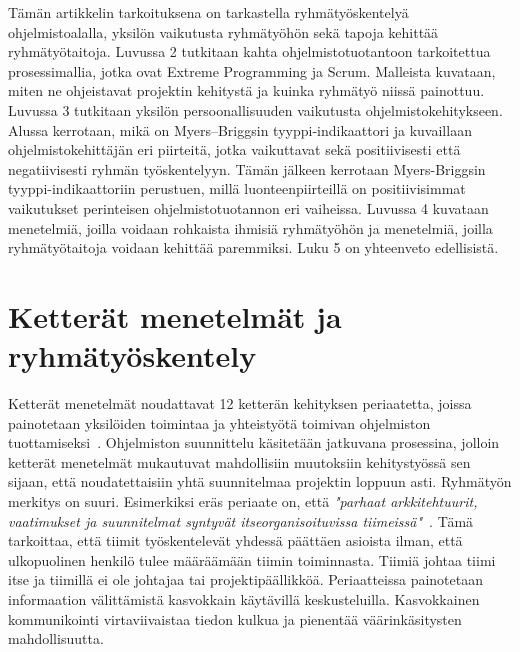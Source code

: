 \documentclass[finnish]{../tktltiki2}
\theoremstyle{definition}
\theoremstyle{remark}
\begin{document}
Tämän artikkelin tarkoituksena on tarkastella ryhmätyöskentelyä ohjelmistoalalla, yksilön vaikutusta ryhmätyöhön sekä tapoja kehittää ryhmätyö\-taitoja.
Luvussa 2 tutkitaan kahta ohjelmistotuotantoon tarkoitettua
prosessimallia, jotka ovat Extreme Programming ja Scrum. Malleista
kuvataan, miten ne ohjeistavat projektin kehitystä ja kuinka ryhmätyö niissä painottuu. Luvussa 3 tutkitaan yksilön persoonallisuuden vaikutusta ohjelmistokehitykseen. Alussa kerrotaan,
mikä on Myers--Briggsin tyyppi-indikaattori ja kuvaillaan ohjelmistokehittäjän eri piirteitä, jotka vaikuttavat sekä positiivisesti että negatiivisesti ryhmän työskentelyyn. Tämän jälkeen kerrotaan Myers-Briggsin tyyppi-indikaattoriin perustuen, millä luonteenpiirteillä on positiivisimmat vaikutukset perinteisen ohjelmistotuotannon eri vaiheissa. Luvussa 4 kuvataan
menetelmiä, joilla voidaan rohkaista ihmisiä ryhmätyöhön ja menetelmiä, joilla ryhmätyötaitoja voidaan kehittää paremmiksi. Luku 5 on yhteenveto
edellisistä.

\section{Ketterät menetelmät ja ryhmätyöskentely}


Ketterät menetelmät noudattavat 12 ketterän 
kehityksen periaatetta, joissa painotetaan yksilöiden toimintaa ja yhteistyötä toimivan ohjelmiston tuottamiseksi~\cite{AgileManifesto}. Ohjelmiston suunnittelu käsitetään jatkuvana prosessina, jolloin ketterät menetelmät mukautuvat mahdollisiin muutoksiin kehitystyössä sen sijaan, että noudatettaisiin yhtä suunnitelmaa projektin loppuun asti. Ryhmätyön merkitys on suuri. Esimerkiksi eräs periaate on, että 
\emph{"parhaat arkkitehtuurit, vaatimukset ja suunnitelmat syntyvät 
itseorganisoituvissa
tiimeissä"}~\cite{AgileManifesto}. Tämä tarkoittaa, että tiimit työskentelevät 
yhdessä päättäen asioista ilman, että ulkopuolinen henkilö tulee
määräämään tiimin toiminnasta. Tiimiä johtaa tiimi itse ja 
tiimillä ei ole johtajaa tai projektipäällikköä. Periaatteissa 
painotetaan informaation välittämistä kasvokkain käytävillä keskusteluilla.
Kasvokkainen kommunikointi virtaviivaistaa tiedon kulkua ja pienentää 
väärinkäsitysten mahdollisuutta.\\
\end{document}
